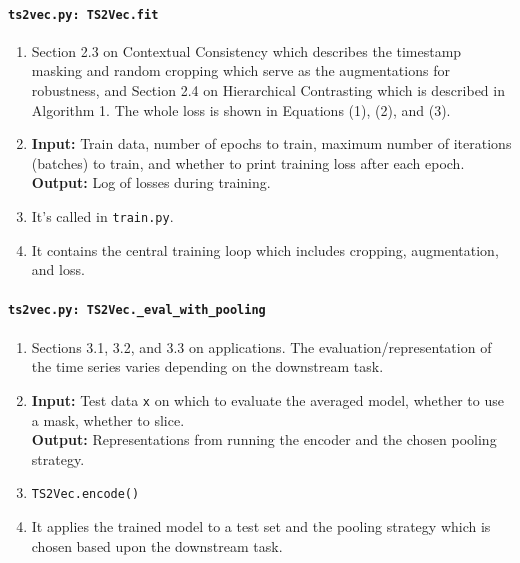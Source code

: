 \documentclass[a4paper,11pt]{article}
\newcommand{\code}[1]{\texttt{#1}}
\begin{document}
\paragraph{\code{ts2vec.py: TS2Vec.fit}}
\begin{enumerate}[label=(\roman*)]
\item Section 2.3 on Contextual Consistency which describes the timestamp masking and random cropping which serve as the augmentations for robustness, and Section 2.4 on Hierarchical Contrasting which is described in Algorithm 1. The whole loss is shown in Equations (1), (2), and (3). 
\item 
    \textbf{Input:} Train data, number of epochs to train, maximum number of iterations (batches) to train, and whether to print training loss after each epoch. \\
    \textbf{Output:} Log of losses during training.
\item It's called in \texttt{train.py}.
\item It contains the central training loop which includes cropping, augmentation, and loss.
\end{enumerate}

\paragraph{\code{ts2vec.py: TS2Vec.\_eval\_with\_pooling}}
\begin{enumerate}[label=(\roman*)]
\item Sections 3.1, 3.2, and 3.3 on applications. The evaluation/representation of the time series varies depending on the downstream task.
\item 
    \textbf{Input:} Test data \texttt{x} on which to evaluate the averaged model, whether to use a mask, whether to slice.\\
    \textbf{Output:} Representations from running the encoder and the chosen pooling strategy.
\item \texttt{TS2Vec.encode()}
\item It applies the trained model to a test set and the pooling strategy which is chosen based upon the downstream task.
\end{enumerate}
\end{document}

